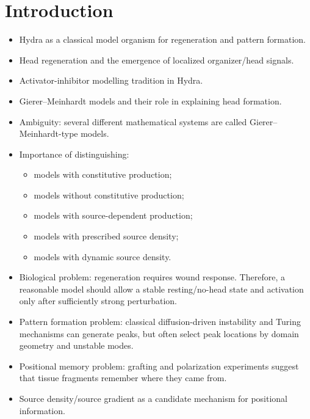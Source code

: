 \section{Introduction}


\begin{itemize}
    \item Hydra as a classical model organism for regeneration and pattern formation.
    \item Head regeneration and the emergence of localized organizer/head signals.
    \item Activator-inhibitor modelling tradition in Hydra.
    \item Gierer--Meinhardt models and their role in explaining head formation.
    \item Ambiguity: several different mathematical systems are called Gierer--Meinhardt-type models.
    \item Importance of distinguishing:
    \begin{itemize}
        \item models with constitutive production;
        \item models without constitutive production;
        \item models with source-dependent production;
        \item models with prescribed source density;
        \item models with dynamic source density.
    \end{itemize}
    \item Biological problem: regeneration requires wound response. Therefore, a reasonable model should allow a stable resting/no-head state and activation only after sufficiently strong perturbation.
    \item Pattern formation problem: classical diffusion-driven instability and Turing mechanisms can generate peaks, but often select peak locations by domain geometry and unstable modes.
    \item Positional memory problem: grafting and polarization experiments suggest that tissue fragments remember where they came from.
    \item Source density/source gradient as a candidate mechanism for positional information.

\end{itemize}
